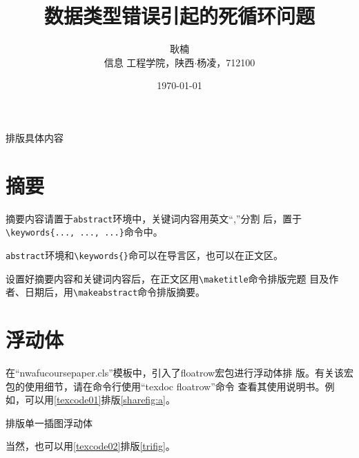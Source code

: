 \documentclass{nwafucoursepaper}
\title{\bfseries\sffamily 数据类型错误引起的死循环问题}
\author{\zihao{4} \fangsong 耿楠\\\small \songti 信息
  工程学院，陕西$\cdot$杨凌，712100}
\date{\small \today}
\begin{document}
\maketitle
\thispagestyle{empty}
\makeabstract

排版具体内容
\section{摘要}
摘要内容请置于\verb|abstract|环境中，关键词内容用英文\enquote{,}分割
后，置于\verb|\keywords{..., ..., ...}|命令中。

\verb|abstract|环境和\verb|\keywords{}|命可以在导言区，也可以在正文区。

设置好摘要内容和关键词内容后，在正文区用\verb|\maketitle|命令排版完题
目及作者、日期后，用\verb|\makeabstract|命令排版摘要。
\section{浮动体}
在\enquote{nwafucoursepaper.cls}模板中，引入了floatrow宏包进行浮动体排
版。有关该宏包的使用细节，请在命令行使用\enquote{texdoc floatrow}命令
查看其使用说明书。例如，可以用\cref{texcode01}排版\autoref{sharefig:a}。

\begin{center}
\begin{minipage}{0.62\linewidth}
\begin{langCVOne}[tex][texcode01][\LaTeX{}]{排版单一插图浮动体}
  \begin{figure}[!htp]
    \begin{floatrow}
    \end{floatrow}
  \end{figure}
\end{langCVOne}
\end{minipage}
\begin{minipage}{0.3\linewidth}
\end{minipage}
\end{center}

当然，也可以用\cref{texcode02}排版\autoref{trifig}。  
\end{document}
